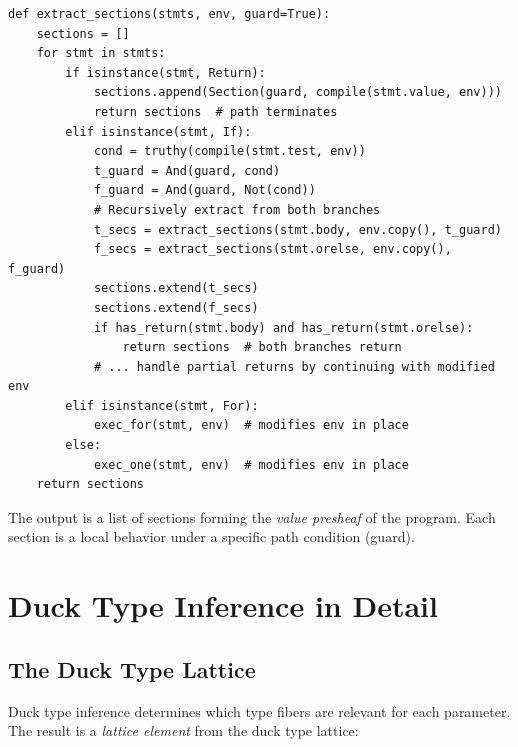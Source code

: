 \begin{lstlisting}[caption={Section extraction algorithm}]
def extract_sections(stmts, env, guard=True):
    sections = []
    for stmt in stmts:
        if isinstance(stmt, Return):
            sections.append(Section(guard, compile(stmt.value, env)))
            return sections  # path terminates
        elif isinstance(stmt, If):
            cond = truthy(compile(stmt.test, env))
            t_guard = And(guard, cond)
            f_guard = And(guard, Not(cond))
            # Recursively extract from both branches
            t_secs = extract_sections(stmt.body, env.copy(), t_guard)
            f_secs = extract_sections(stmt.orelse, env.copy(), f_guard)
            sections.extend(t_secs)
            sections.extend(f_secs)
            if has_return(stmt.body) and has_return(stmt.orelse):
                return sections  # both branches return
            # ... handle partial returns by continuing with modified env
        elif isinstance(stmt, For):
            exec_for(stmt, env)  # modifies env in place
        else:
            exec_one(stmt, env)  # modifies env in place
    return sections
\end{lstlisting}

The output is a list of sections forming the \emph{value presheaf}
of the program.  Each section is a local behavior under a specific
path condition (guard).


\chapter{Duck Type Inference in Detail}
\label{ch:duck-detail}

\section{The Duck Type Lattice}

Duck type inference determines which type fibers are relevant for
each parameter.  The result is a \emph{lattice element} from the
duck type lattice:


